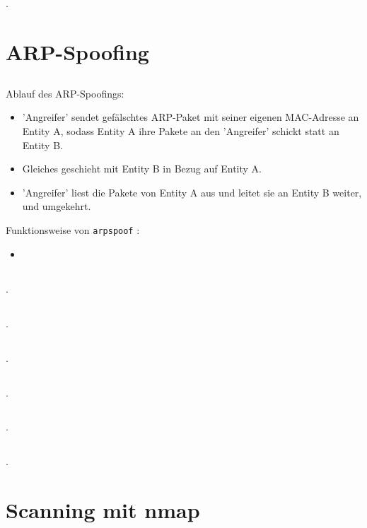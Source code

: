 \documentclass[twoside]{article}
\newcommand{\ttt}[1]{%
	\texttt{#1}%
}
\begin{document}
\subsection{}.


\section{ARP-Spoofing}
\subsection{}
Ablauf des ARP-Spoofings:
\begin{itemize}
	\item 'Angreifer' sendet gefälschtes ARP-Paket mit seiner eigenen MAC-Adresse an Entity A, sodass Entity A ihre Pakete an den 'Angreifer' schickt statt an Entity B.
	\item Gleiches geschieht mit Entity B in Bezug auf Entity A.
	\item 'Angreifer' liest die Pakete von Entity A aus und leitet sie an Entity B weiter, und umgekehrt.
\end{itemize}
Funktionsweise von \ttt{arpspoof}:
\begin{itemize}
	\item 
\end{itemize}
\subsection{}.
\subsection{}.
\subsection{}.
\subsection{}.
\subsection{}.
\subsection{}.


\section{Scanning mit nmap}
\end{document}
